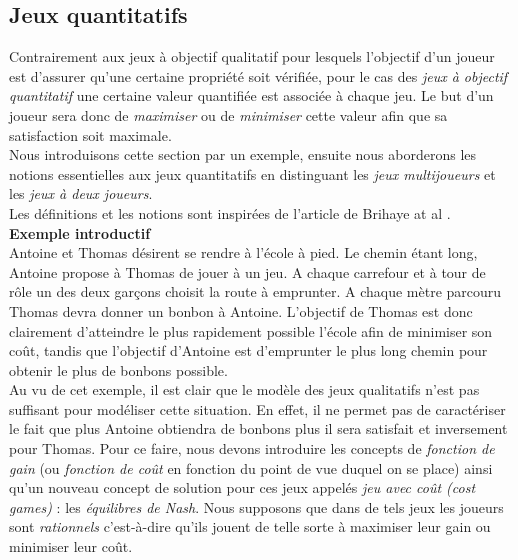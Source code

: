 
\subsection{Jeux quantitatifs }

Contrairement aux jeux à objectif qualitatif pour lesquels l'objectif d'un joueur est d'assurer qu'une certaine propriété soit vérifiée, pour le cas des \textit{jeux à objectif quantitatif} une certaine valeur quantifiée est associée à chaque jeu. Le but d'un joueur sera donc de \textit{maximiser} ou de \textit{minimiser} cette valeur afin que sa satisfaction soit maximale.\\

Nous introduisons cette section par un exemple, ensuite nous aborderons les notions essentielles aux jeux quantitatifs en distinguant les \textit{jeux multijoueurs} et les \textit{jeux à deux joueurs}.\\
Les définitions et les notions sont inspirées de l'article de Brihaye at al \cite{DBLP:conf/lfcs/BrihayePS13}.\\

\noindent\textbf {Exemple introductif} \\
\indent Antoine et Thomas désirent se rendre à l'école à pied. Le chemin étant long, Antoine propose à Thomas de jouer à un jeu. A chaque carrefour et à tour de rôle un des deux garçons choisit la route à emprunter. A chaque mètre parcouru Thomas devra donner un bonbon à Antoine. L'objectif de Thomas est donc clairement d'atteindre le plus rapidement possible l'école afin de minimiser son coût, tandis que l'objectif d'Antoine est d'emprunter le plus long chemin pour obtenir le plus de bonbons possible.\\

Au vu de cet exemple, il est clair que le modèle des jeux qualitatifs n'est pas suffisant pour modéliser cette situation. En effet, il ne permet pas de caractériser le fait que plus Antoine obtiendra de bonbons plus il sera satisfait et inversement pour Thomas. Pour ce faire, nous devons introduire les concepts de \textit{fonction de gain} (ou \textit{fonction de coût} en fonction du point de vue duquel on se place) ainsi qu'un nouveau concept de solution pour ces jeux appelés \textit{jeu avec coût (cost games)} : les \textit{équilibres de Nash}. Nous supposons que dans de tels jeux les joueurs sont \textit{rationnels} c'est-à-dire qu'ils jouent de telle sorte à maximiser leur gain ou minimiser leur coût.\\

